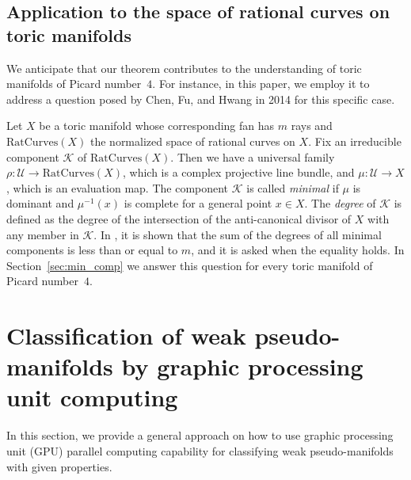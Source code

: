 \documentclass[11pt]{amsart}
\theoremstyle{plain}
\numberwithin{equation}{section}
\theoremstyle{definition}
\newcommand{\cK}{\mathcal{K}}
\newcommand{\cU}{\mathcal{U}}
\begin{document}


\subsection*{Application to the space of rational curves on toric manifolds}
We anticipate that our theorem contributes to the understanding of toric manifolds of Picard number~$4$.
For instance, in this paper, we employ it to address a question posed by Chen, Fu, and Hwang\cite{fu2014minimal} in 2014 for this specific case.

Let $X$ be a toric manifold whose corresponding fan has $m$ rays and $\text{RatCurves}(X)$ the normalized space of rational curves on $X$.
Fix an irreducible component $\cK$ of $\text{RatCurves}(X)$.
Then we have a universal family $\rho \colon \cU \longrightarrow \text{RatCurves}(X)$, which is a complex projective line bundle, and $\mu \colon \cU \longrightarrow X$, which is an evaluation map.
The component $\cK$ is called \emph{minimal} if $\mu$ is dominant and $\mu^{-1}(x)$ is complete for a general point $x \in X$.
The \emph{degree} of $\cK$ is defined as the degree of the intersection of the anti-canonical divisor of $X$ with any member in $\cK$.
In \cite{fu2014minimal}, it is shown that the sum of the degrees of all minimal components is less than or equal to $m$, and it is asked when the equality holds.
In Section~\ref{sec:min_comp} we answer this question for every toric manifold of Picard number~$4$.


\section{Classification of weak pseudo-manifolds by graphic processing unit computing} \label{section:graphic processing unit algorithm}
In this section, we provide a general approach on how to use graphic processing unit (GPU) parallel computing capability for classifying weak pseudo-manifolds with given properties.
\end{document}
